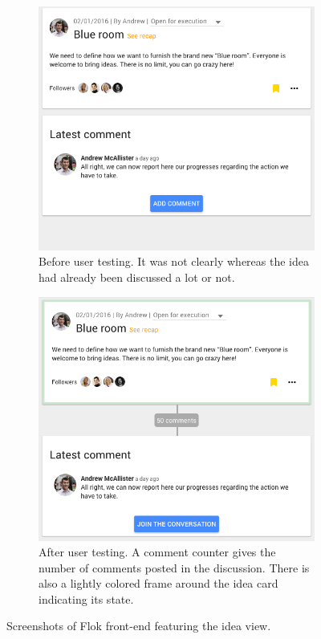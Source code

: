 \documentclass[a4paper,12pt,twoside]{article}
\begin{document}
\begin{figure}[!htb]
    \begin{subfigure}[t]{.495\textwidth}
        \includegraphics[width=\textwidth]{images/user_tests/ideaView_before.png}
        \caption{Before user testing. It was not clearly whereas the idea had already been discussed a lot or not.}
        \label{fig.tests.ideaView.before}
    \end{subfigure}
    \begin{subfigure}[t]{.495\textwidth}
        \includegraphics[width=\textwidth]{images/user_tests/ideaView_after.png}
        \caption{After user testing. A comment counter gives the number of comments posted in the discussion. There is also a lightly colored frame around the idea card indicating its state.}
        \label{fig.tests.ideaView.after}
    \end{subfigure}
    \caption{Screenshots of Flok front-end featuring the idea view.}
    \label{fig.tests.ideaView}
\end{figure}
\end{document}
